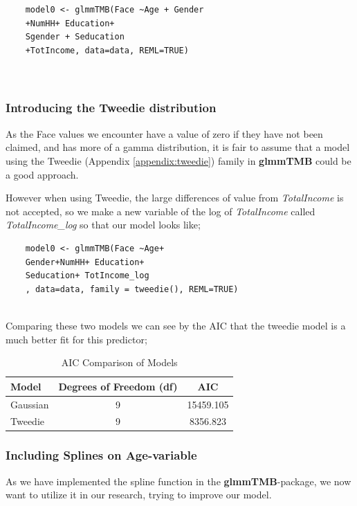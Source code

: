 \documentclass[12pt, twoside,hidelinks]{article}
\theoremstyle{definition}
\numberwithin{equation}{section}
\begin{document}
\begin{verbatim}
    model0 <- glmmTMB(Face ~Age + Gender
    +NumHH+ Education+ 
    Sgender + Seducation
    +TotIncome, data=data, REML=TRUE)

    
\end{verbatim}


\subsubsection{Introducing the Tweedie distribution}

As the Face values we encounter have a value of zero if they have not been claimed, and has more of a gamma distribution, it is fair to assume that a model using the Tweedie (Appendix \ref{appendix:tweedie}) family  in \textbf{glmmTMB} could be a good approach.
\newline

However when using Tweedie, the large differences of value from \textit{TotalIncome} is not accepted, so we make a new variable of the log of \textit{TotalIncome} called \textit{TotalIncome\_log} so that our model looks like;

\begin{verbatim}
    model0 <- glmmTMB(Face ~Age+
    Gender+NumHH+ Education+ 
    Seducation+ TotIncome_log
    , data=data, family = tweedie(), REML=TRUE)
    
\end{verbatim}

Comparing these two models we can see by the AIC that the tweedie model is a much better fit for this predictor;

\begin{table}[ht]
\centering
\caption{AIC Comparison of Models}
\begin{tabular}{lcc}
\hline
Model & Degrees of Freedom (df) & AIC \\
\hline
Gaussian & 9 & 15459.105 \\
Tweedie & 9 & 8356.823 \\
\hline
\end{tabular}
\label{tab:aic_comparison}
\end{table}



\subsubsection{Including Splines on Age-variable}
As we have implemented the spline function in the \textbf{glmmTMB}-package, we now want to utilize it in our research, trying to improve our model.
\end{document}
